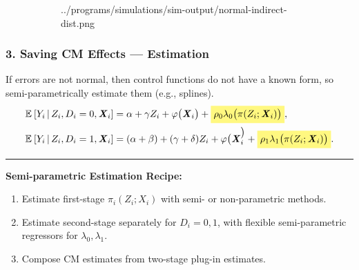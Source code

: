 \documentclass[dvipsnames]{beamer} %
\renewcommand{\vec}[1]{\boldsymbol{\mathit{#1}}}                           %
\newcommand{\E}[2][]{\mathbb{E}_{#1} \left[ #2 \right]}                    %
\newcommand{\Egiven}[3][]{\mathbb{E}_{#1} \left[ #2 \, \middle\vert \, #3 \right]} %
\renewcommand{\hat}[1]{\widehat{#1}}                                       %
\renewcommand{\bar}[1]{\overline{#1}}                                      %
\newcommand{\eqhighlight}[2]{\colorbox{#1!50}{$\displaystyle#2$}}
\begin{document}
\begin{frame}[noframenumbering]
\begin{figure}
\begin{subfigure}[c]{0.475\textwidth}
{                ../programs/simulations/sim-output/normal-indirect-dist.png}
        \end{subfigure}
    \end{figure}
\end{frame}
\begin{frame}
    \frametitle{3. Saving CM Effects --- Estimation}
    If errors are not normal, then control functions do not have a known form, so semi-parametrically estimate them (e.g., splines).
    \begin{align*}
        \Egiven{Y_i}{Z_i, D_i = 0, \vec X_i} &=
            \alpha + \gamma Z_i + \varphi\big( \vec X_i \big)
            + \eqhighlight{yellow}{\rho_0 \lambda_0 \big( \pi(Z_i ; \vec X_i) \big)}, \\
        \Egiven{Y_i}{Z_i, D_i = 1, \vec X_i} &=
            (\alpha + \beta) + (\gamma + \delta) Z_i + \varphi\big( \vec X_i^\big)
            + \eqhighlight{yellow}{\rho_1 \lambda_1 \big( \pi(Z_i ; \vec X_i) \big)}.
    \end{align*}

    \par\noindent\rule{\textwidth}{0.4pt}
    \textbf{Semi-parametric Estimation Recipe:}
    \begin{enumerate}
        \item Estimate first-stage $\pi_i(Z_i; \vec X_i)$ with semi- or non-parametric methods.
        \item Estimate second-stage separately for $D_i = 0,1$, with flexible semi-parametric regressors for $\lambda_0, \lambda_1$.
        \item Compose CM estimates from two-stage plug-in estimates. 
    \end{enumerate}
    \hyperlink{cf-semiparametric}{}
    
    \vskip0.25cm
    \makebox[\textwidth]{\parbox{1.25\textwidth}{
        \small
        \[ \hat{\text{ADE}}
            = \E{\hat\gamma + \hat\delta D_i}, \;\;
        \hat{\text{AIE}}
            = \mathbb E \Bigg[ \, \hat{\bar \pi} \,
                \Big( \hat\beta +  \hat\delta Z_i +
                    (\hat\rho_1 - \hat\rho_0) \,
                    \Gamma \big(\hat\pi(0; \vec X_i), \, \hat\pi(1; \vec X_i) \big)\Big) \Bigg] \]
    }}
\end{frame}
\end{document}

